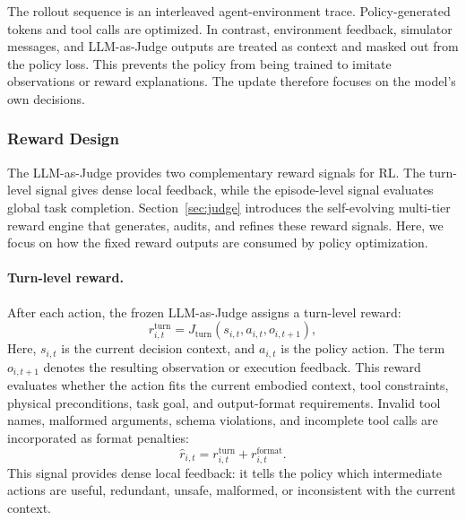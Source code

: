 The rollout sequence is an interleaved agent-environment trace. Policy-generated tokens and tool calls are optimized. In contrast, environment feedback, simulator messages, and LLM-as-Judge outputs are treated as context and masked out from the policy loss. This prevents the policy from being trained to imitate observations or reward explanations. The update therefore focuses on the model's own decisions.

\subsubsection{Reward Design}

The LLM-as-Judge provides two complementary reward signals for RL. The turn-level signal gives dense local feedback, while the episode-level signal evaluates global task completion. Section~\ref{sec:judge} introduces the self-evolving multi-tier reward engine that generates, audits, and refines these reward signals. Here, we focus on how the fixed reward outputs are consumed by policy optimization.

\paragraph{Turn-level reward.}
After each action, the frozen LLM-as-Judge assigns a turn-level reward:
\begin{equation}
r_{i,t}^{\mathrm{turn}}
=
J_{\mathrm{turn}}(s_{i,t},a_{i,t},o_{i,t+1}),
\end{equation}
Here, $s_{i,t}$ is the current decision context, and $a_{i,t}$ is the policy action. The term $o_{i,t+1}$ denotes the resulting observation or execution feedback. This reward evaluates whether the action fits the current embodied context, tool constraints, physical preconditions, task goal, and output-format requirements. Invalid tool names, malformed arguments, schema violations, and incomplete tool calls are incorporated as format penalties:
\begin{equation}
\hat r_{i,t}
=
r_{i,t}^{\mathrm{turn}}
+
r_{i,t}^{\mathrm{format}}.
\end{equation}
This signal provides dense local feedback: it tells the policy which intermediate actions are useful, redundant, unsafe, malformed, or inconsistent with the current context.

